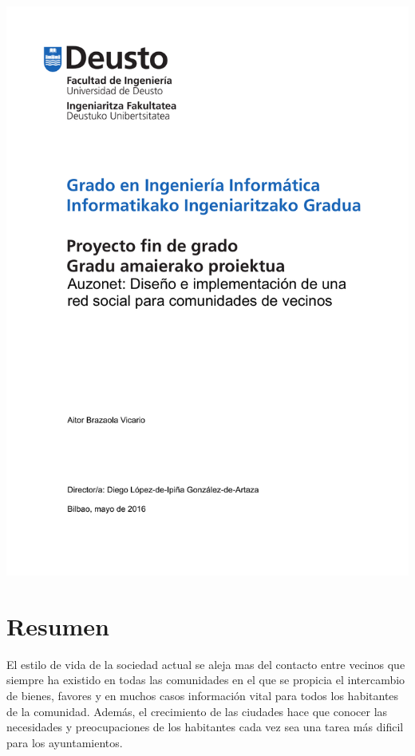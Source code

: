\documentclass{DeustoFDP}
\begin{document}
\frontmatter
\pagestyle{plain}

\begin{titlepage}
  \includegraphics{fig/portada}
  \restoregeometry
\end{titlepage}
\cleardoublepage

\setcounter{page}{3}

\chapter*{Resumen}
El estilo de vida de la sociedad actual se aleja mas del contacto entre vecinos
que siempre ha existido en todas las comunidades en el que se propicia el
intercambio de bienes, favores y en muchos casos información vital para todos
los habitantes de la comunidad. Además, el crecimiento de las ciudades hace
que conocer las necesidades y preocupaciones de los habitantes cada vez sea una
tarea más dificil para los ayuntamientos.
\end{document}
